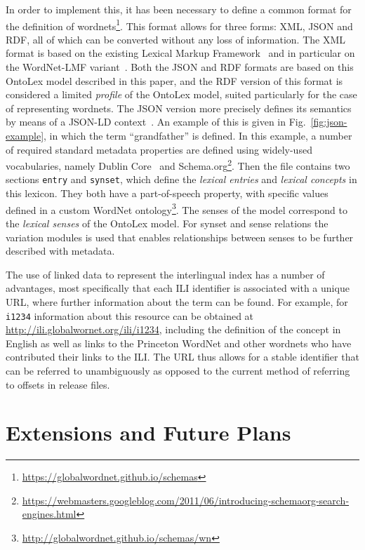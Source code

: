 \documentclass[12pt,a4paper]{elex2017}
\begin{document}
In order to implement this, it has been necessary to define a common format for
the definition of
wordnets\footnote{\url{https://globalwordnet.github.io/schemas}}. This format
allows for three forms: XML, JSON and RDF, all of which can be converted without
any loss of information. The XML format is based on the existing Lexical Markup
Framework~\citep{francopoulo2006lexical} and in particular on the WordNet-LMF
variant~\citep{soria2009wordnet}. Both the JSON and RDF formats are based on this
OntoLex model described in this paper, and the RDF version of this format is
considered a limited \emph{profile} of the OntoLex model, suited particularly
for the case of representing wordnets. The JSON version more precisely defines
its semantics by means of a JSON-LD context~\citep{sporny2014json}. An example
of this is given in Fig.~\ref{fig:json-example}, in which the term
``grandfather'' is defined. In this example, a number of required standard
metadata properties are defined using widely-used vocabularies, namely Dublin
Core~\citep{rfc2413} and
Schema.org\footnote{\url{https://webmasters.googleblog.com/2011/06/introducing-schemaorg-search-engines.html}}.
Then the file contains two sections \texttt{entry} and \texttt{synset}, which
define the \emph{lexical entries} and \emph{lexical concepts} in this lexicon.
They both have a part-of-speech property, with specific values defined in a
custom WordNet
ontology\footnote{\url{http://globalwordnet.github.io/schemas/wn}}. The senses
of the model correspond to the \emph{lexical senses} of the OntoLex
model. For synset and sense relations the variation modules is used that enables
relationships between senses to be further described with metadata.

The use of linked data to represent the interlingual index has a number of
advantages, most specifically that each ILI identifier is associated with a
unique URL, where further information about the term can be found. For example,
for \texttt{i1234} information about this resource can be obtained at
\url{http://ili.globalwornet.org/ili/i1234}, including the definition of the
concept in English as well as links to the Princeton WordNet and other wordnets
who have contributed their links to the ILI. The URL thus allows for a stable
identifier that can be referred to unambiguously as opposed to the current
method of referring to offsets in release files.

\section{Extensions and Future Plans}
\end{document}
